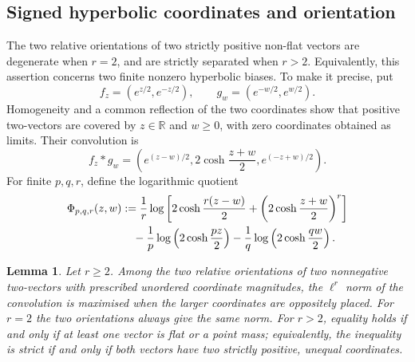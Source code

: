 \documentclass[11pt,reqno]{amsart}
\numberwithin{equation}{section}
\newtheorem{lemma}[lemma]{Lemma}
\theoremstyle{definition}
\theoremstyle{remark}
\newcommand{\R}{\mathbb R}
\begin{document}
\subsection{Signed hyperbolic coordinates and orientation}

The two relative orientations of two strictly positive non-flat vectors are
degenerate when $r=2$, and are strictly separated when $r>2$.  Equivalently,
this assertion concerns two finite nonzero hyperbolic biases.  To make it
precise, put
\begin{equation}\label{eq:signed-profiles}
  f_z=(e^{z/2},e^{-z/2}),
  \qquad
  g_w=(e^{-w/2},e^{w/2}).
\end{equation}
Homogeneity and a common reflection of the two coordinates show that positive
two-vectors are covered by $z\in\R$ and $w\ge0$, with zero coordinates obtained
as limits.  Their convolution is
\[
  f_z*g_w
  =
  \left(
    e^{(z-w)/2},
    2\cosh\frac{z+w}{2},
    e^{(-z+w)/2}
  \right).
\]
For finite $p,q,r$, define the logarithmic quotient
\begin{align}\label{eq:Phi-def}
  \Phi_{p,q,r}(z,w)
  &:=\frac1r\log\left[
    2\cosh\frac{r(z-w)}2
    +\left(2\cosh\frac{z+w}{2}\right)^r
  \right]\notag\\
  &\quad
  -\frac1p\log\left(2\cosh\frac{pz}{2}\right)
  -\frac1q\log\left(2\cosh\frac{qw}{2}\right).
\end{align}

\begin{lemma}\label{lem:orientation}
Let $r\ge2$.  Among the two relative orientations of two nonnegative
two-vectors with prescribed unordered coordinate magnitudes, the $\ell^r$ norm
of the convolution is maximised when the larger coordinates are oppositely
placed.  For $r=2$ the two orientations always give the same norm.  For
$r>2$, equality holds if and only if at least one vector is flat or a point
mass; equivalently, the inequality is strict if and only if both vectors have
two strictly positive, unequal coordinates.
\end{lemma}
\end{document}
